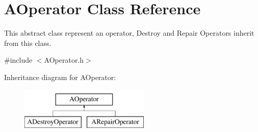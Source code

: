 \hypertarget{classAOperator}{\section{A\-Operator Class Reference}
\label{classAOperator}
}


This abstract class represent an operator, Destroy and Repair Operators inherit from this class.  




{\ttfamily \#include $<$A\-Operator.\-h$>$}

Inheritance diagram for A\-Operator\-:\begin{figure}[H]
\begin{center}
\leavevmode
\includegraphics[height=2.000000cm]{classAOperator}
\end{center}
\end{figure}
